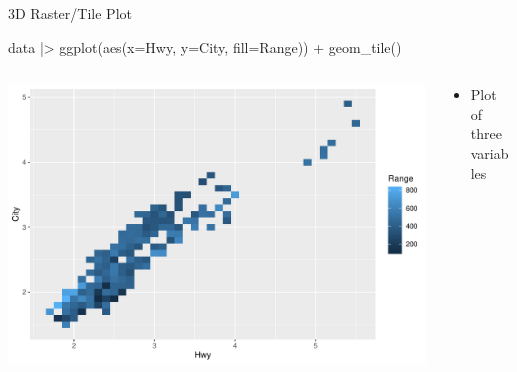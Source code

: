 \documentclass[ignorenonframetext,xcolor=x11names]{beamer}
\begin{document}



\begin{frame}[fragile]{3D Raster/Tile Plot}
\footnotesize
\begin{Rcode}
data |>
  ggplot(aes(x=Hwy, y=City, fill=Range)) + 
    geom_tile() 
\end{Rcode}
\begin{columns}
\begin{column}{.75\textwidth}
  \includegraphics[width=\textwidth]{fuel.raster.pdf}
\end{column}
\begin{column}{.25\textwidth}
\begin{itemize}
  \item Plot of three variables
\end{itemize}
\end{column}
\end{columns}
\end{frame}
\end{document}
